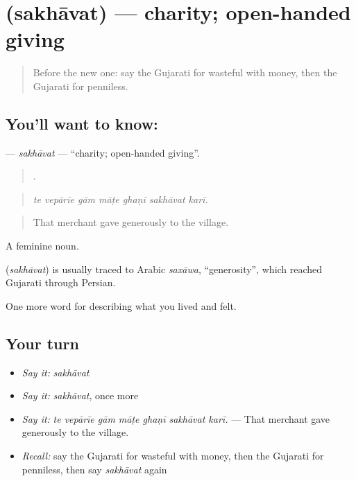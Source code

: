 \section[\texorpdfstring{\gu{સખાવત} (sakhāvat)}{સખાવત (sakhāvat)}]{ (sakhāvat) — charity; open-handed giving}

\label{lesson:GU-C461-sakhavat}



\begin{quote}
Before the new one: say the Gujarati for wasteful with money, then the Gujarati for penniless.
\end{quote}

\subsection*{You'll want to know: }
\textbf{} — \emph{sakhāvat} — \textquotedblleft{}charity; open-handed giving\textquotedblright{}.

\begin{quote}
      .
\end{quote}

\begin{quote}
\emph{te vepārīe gām māṭe ghaṇī sakhāvat karī.}
\end{quote}

\begin{quote}
That merchant gave generously to the village.
\end{quote}

A feminine noun.

\begin{cousinweb}
\textbf{} (\emph{sakhāvat}) is usually traced to Arabic \emph{saxāwa}, \textquotedblleft{}generosity\textquotedblright{}, which reached Gujarati through Persian.
\end{cousinweb}

\begin{grammarlens}[title={What you've built}]
One more word for describing what you lived and felt.
\end{grammarlens}

\subsection*{Your turn}
\begin{itemize}
\raggedright
  \item \emph{Say it:} \emph{sakhāvat}
  \item \emph{Say it:} \emph{sakhāvat}, once more
  \item \emph{Say it:} \emph{te vepārīe gām māṭe ghaṇī sakhāvat karī.} — That merchant gave generously to the village.
  \item \emph{Recall:} say the Gujarati for wasteful with money, then the Gujarati for penniless, then say \emph{sakhāvat} again
\end{itemize}

